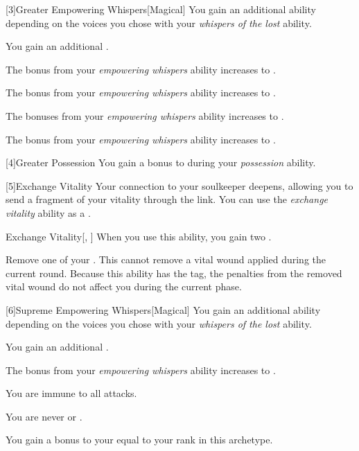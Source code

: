         [3]{Greater Empowering Whispers}[Magical] You gain an additional ability depending on the voices you chose with your \textit{whispers of the lost} ability.
        {
             You gain an additional .

             The bonus from your \textit{empowering whispers} ability increases to .

             The bonus from your \textit{empowering whispers} ability increases to .

             The bonuses from your \textit{empowering whispers} ability increases to .

             The bonus from your \textit{empowering whispers} ability increases to .
        }

        [4]{Greater Possession} You gain a  bonus to  during your \textit{possession} ability.

        [5]{Exchange Vitality} Your connection to your soulkeeper deepens, allowing you to send a fragment of your vitality through the link.
        You can use the \textit{exchange vitality} ability as a .
        \begin{freeability}{Exchange Vitality}[, ]
            When you use this ability, you gain two .

            Remove one of your .
            This cannot remove a vital wound applied during the current round.
            Because this ability has the  tag, the penalties from the removed vital wound do not affect you during the current phase.
        \end{freeability}

        [6]{Supreme Empowering Whispers}[Magical] You gain an additional ability depending on the voices you chose with your \textit{whispers of the lost} ability.
        {
             You gain an additional .

             The bonus from your \textit{empowering whispers} ability increases to .

             You are immune to all  attacks.

             You are never  or .

             You gain a bonus to your  equal to your rank in this archetype.
        }

